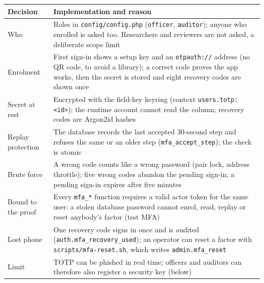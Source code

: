 \documentclass[10pt,a4paper]{article}
\newcommand{\code}[1]{\nolinkurl{#1}}
\begin{document}
\begin{center}\small{}\label{tab:mfadesign}
\begin{tabularx}{\linewidth}{@{}L{3.3cm}Y@{}}
\toprule\textbf{Decision} & \textbf{Implementation and reason}\\\midrule
Who & Roles in \code{config/config.php} (\code{officer}, \code{auditor}); anyone who enrolled is asked too. Researchers and reviewers are not asked, a deliberate scope limit\\
Enrolment & First sign-in shows a setup key and an \code{otpauth://} address (no QR code, to avoid a library); a correct code proves the app works, then the secret is stored and eight recovery codes are shown once\\
Secret at rest & Encrypted with the field-key keyring (context \code{users.totp:<id>}); the runtime account cannot read the column; recovery codes are Argon2id hashes\\
Replay protection & The database records the last accepted 30-second step and refuses the same or an older step (\code{mfa\_accept\_step}); the check is atomic\\
Brute force & A wrong code counts like a wrong password (pair lock, address throttle); five wrong codes abandon the pending sign-in; a pending sign-in expires after five minutes\\
Bound to the proof & Every \code{mfa\_*} function requires a valid actor token for the same user: a stolen database password cannot enrol, read, replay or reset anybody's factor (test MFA)\\
Lost phone & One recovery code signs in once and is audited (\code{auth.mfa\_recovery\_used}); an operator can reset a factor with \code{scripts/mfa-reset.sh}, which writes \code{admin.mfa\_reset}\\
Limit & TOTP can be phished in real time; officers and auditors can therefore also register a security key (below)\\
\bottomrule\end{tabularx}\end{center}
\end{document}
